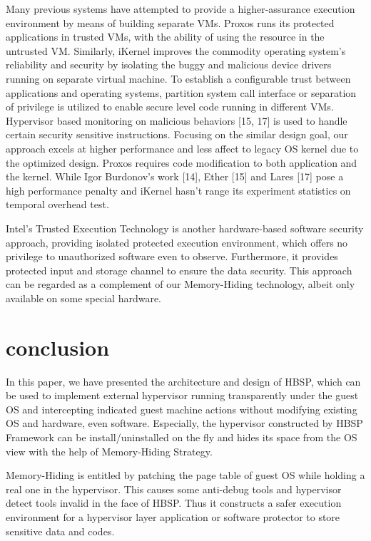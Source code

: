 \documentclass[conference]{IEEEtran}
\begin{document}
{Many previous systems have attempted to provide a higher-assurance
execution environment by means of building separate VMs.
Proxos\cite{IEEEhowto:12} runs its protected applications in
trusted VMs, with the ability of using the resource in the
untrusted VM. Similarly, iKernel\cite{IEEEhowto:13} improves the
commodity operating system's reliability and security by isolating
the buggy and malicious device drivers running on separate virtual
machine. To establish a configurable trust between applications
and operating systems, partition system call interface  or
separation of privilege\cite{IEEEhowto:15} is utilized to enable
secure level code running in different VMs. Hypervisor based
monitoring on malicious behaviors [15, 17] is used to handle
certain security sensitive instructions. Focusing on the similar
design goal, our approach excels at higher performance and less
affect to legacy OS kernel due to the optimized design. Proxos
\cite{IEEEhowto:12} requires code modification to both application
and the kernel. While Igor Burdonov's work [14], Ether [15] and
Lares [17] pose a high performance penalty and iKernel
\cite{IEEEhowto:13} hasn't range its experiment statistics on
temporal overhead test.

Intel's Trusted Execution Technology\cite{IEEEhowto:17} is another
hardware-based software security approach, providing isolated
protected execution environment, which offers no privilege to
unauthorized software even to observe. Furthermore, it provides
protected input and storage channel to ensure the data security.
This approach can be regarded as a complement of our Memory-Hiding
technology, albeit only available on some special hardware.

\bigskip

\section{conclusion}
In this paper, we have presented the architecture and design of
HBSP, which can be used to implement external hypervisor running
transparently under the guest OS and intercepting indicated guest
machine actions without modifying existing OS and hardware, even
software. Especially, the hypervisor constructed by HBSP Framework
can be install/uninstalled on the fly and hides its space from the
OS view with the help of Memory-Hiding Strategy.

Memory-Hiding is entitled by patching the page table of guest OS
while holding a real one in the hypervisor. This causes some
anti-debug tools and hypervisor detect tools invalid in the face
of HBSP. Thus it constructs a safer execution environment for a
hypervisor layer application or software protector to store
sensitive data and codes.

}
\end{document}
